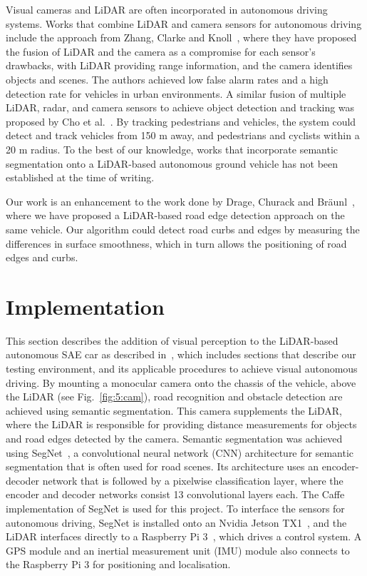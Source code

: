 Visual cameras and LiDAR are often incorporated in autonomous driving systems. Works that combine LiDAR and camera sensors for autonomous driving include the approach from Zhang, Clarke and Knoll~\cite{f._zhang_vehicle_2014}, where they have proposed the fusion of LiDAR and the camera as a compromise for each sensor's drawbacks, with LiDAR providing range information, and the camera identifies objects and scenes. The authors achieved low false alarm rates and a high detection rate for vehicles in urban environments.  A similar fusion of multiple LiDAR, radar, and camera sensors to achieve object detection and tracking was proposed by Cho et al.~\cite{h._cho_multi-sensor_2014}. By tracking pedestrians and vehicles, the system could detect and track vehicles from 150 m away, and pedestrians and cyclists within a 20 m radius. To the best of our knowledge, works that incorporate semantic segmentation onto a LiDAR-based autonomous ground vehicle has not been established at the time of writing. 

Our work is an enhancement to the work done by Drage, Churack and Br\"aunl~\cite{drage_lidar_2015}, where we have proposed a LiDAR-based road edge detection approach on the same vehicle. Our algorithm could detect road curbs and edges by measuring the differences in surface smoothness, which in turn allows the positioning of road edges and curbs.

\section{Implementation}
This section describes the addition of visual perception to the LiDAR-based autonomous SAE car as described in~\cite{drage_lidar_2015}, which includes sections that describe our testing environment, and its applicable procedures to achieve visual autonomous driving. By mounting a monocular camera onto the chassis of the vehicle,  above the LiDAR (see Fig.~\ref{fig:5:cam}), road recognition and obstacle detection are achieved using semantic segmentation. This camera supplements the LiDAR, where the LiDAR is responsible for providing distance measurements for objects and road edges detected by the camera. Semantic segmentation was achieved using SegNet~\cite{badrinarayanan_segnet:_2017}, a convolutional neural network (CNN) architecture for semantic segmentation that is often used for road scenes. Its architecture uses an encoder-decoder network that is followed by a pixelwise classification layer, where the encoder and decoder networks consist 13 convolutional layers each. The Caffe~\cite{jia_caffe:_2014} implementation of SegNet is used for this project. To interface the sensors for autonomous driving, SegNet is installed onto an Nvidia Jetson TX1~\cite{nvidia_corporation_embedded_2017-1}, and the LiDAR interfaces directly to a Raspberry Pi 3~\cite{raspberry_pi_foundation_raspberry_2017}, which drives a control system. A GPS module and an inertial measurement unit (IMU) module also connects to the Raspberry Pi 3 for positioning and localisation. 

